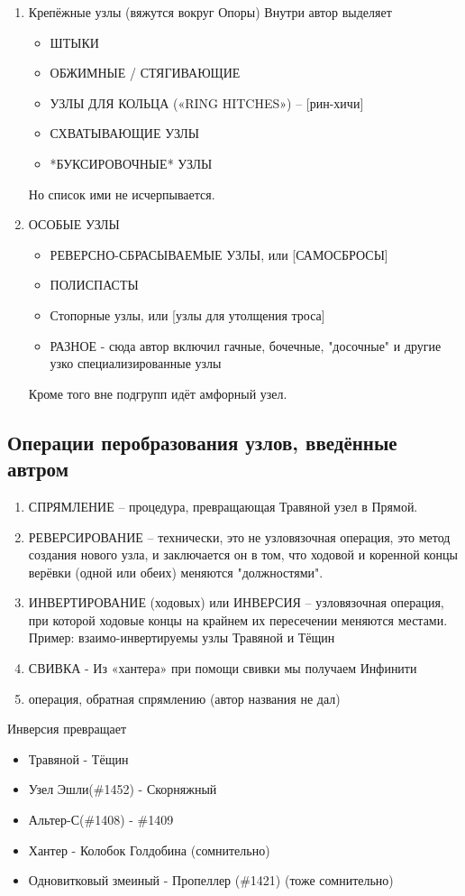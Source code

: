 \begin{enumerate}
\begin{enumerate}
\end{enumerate}
\item Крепёжные узлы (вяжутся вокруг Опоры)
Внутри автор выделяет
\begin{itemize}
\item ШТЫКИ
\item ОБЖИМНЫЕ / СТЯГИВАЮЩИЕ
\item УЗЛЫ ДЛЯ КОЛЬЦА («RING HITCHES») – [рин-хичи]
\item СХВАТЫВАЮЩИЕ УЗЛЫ
\item *БУКСИРОВОЧНЫЕ* УЗЛЫ
\end{itemize}
Но список ими не исчерпывается.
\item ОСОБЫЕ УЗЛЫ
\begin{itemize}
\item РЕВЕРСНО-СБРАСЫВАЕМЫЕ УЗЛЫ, или [САМОСБРОСЫ]
\item ПОЛИСПАСТЫ
\item Стопорные узлы, или [узлы для утолщения троса]
\item РАЗНОЕ - сюда автор включил гачные, бочечные, "досочные" и другие узко специализированные узлы
\end{itemize}
Кроме того вне подгрупп идёт амфорный узел.
\end{enumerate}

\subsection{Операции перобразования узлов, введённые автром}

\begin{enumerate}
\item СПРЯМЛЕНИЕ  – процедура, превращающая Травяной узел в Прямой. 
\item РЕВЕРСИРОВАНИЕ  – технически, это не узловязочная операция, это метод создания нового узла, и заключается он в том, что ходовой и коренной концы верёвки (одной или обеих) меняются "должностями".
\item ИНВЕРТИРОВАНИЕ (ходовых) или ИНВЕРСИЯ  – узловязочная операция, при которой ходовые концы на крайнем их пересечении меняются местами. Пример: взаимо-инвертируемы узлы Травяной и Тёщин 
\item СВИВКА - Из «хантера» при помощи свивки мы получаем Инфинити
\item операция, обратная спрямлению (автор названия не дал)
\end{enumerate}


Инверсия превращает
\begin{itemize}
\item Травяной - Тёщин
\item Узел Эшли(\#1452) - Скорняжный 
\item Альтер-С(\#1408) - \#1409
\item Хантер - Колобок Голдобина (сомнительно)
\item Одновитковый змеиный - Пропеллер (\#1421) (тоже сомнительно)
\end{itemize}



